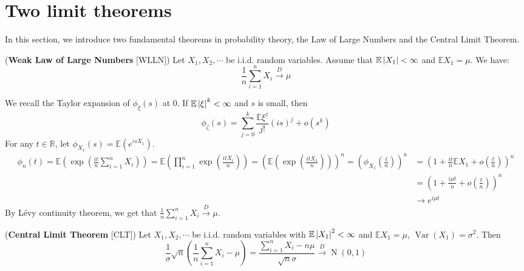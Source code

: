 \documentclass{huhtakm-template-book}
\newcommand{\expect}{\mathbb{E}}
\DeclareMathOperator{\N}{N}
\DeclareMathOperator{\Var}{Var}
\begin{document}
\section{Two limit theorems}
In this section, we introduce two fundamental theorems in probability theory, the Law of Large Numbers and the Central Limit Theorem.
\begin{thm}(\textbf{Weak Law of Large Numbers} [WLLN])
	Let $X_{1},X_{2},\cdots$ be i.i.d. random variables. Assume that $\expect\abs{X_{1}}<\infty$ and $\expect X_{1}=\mu$. We have:
	\begin{equation*}
		\frac{1}{n}\sum_{i=1}^{n}X_{i}\xrightarrow{D}\mu
	\end{equation*}
\end{thm}
\begin{proofing}
	We recall the Taylor expansion of $\phi_{\xi}(s)$ at $0$. If $\expect\abs{\xi}^{k}<\infty$ and $s$ is small, then
	\begin{equation*}
		\phi_{\zeta}(s)=\sum_{j=0}^{k}\frac{\expect\xi^{j}}{j!}(is)^{j}+o(s^{k})
	\end{equation*}
	For any $t\in\mathbb{R}$, let $\phi_{X_{1}}(s)=\expect(e^{isX_{1}})$.
	\begin{align*}
		\phi_{n}(t)=\expect\left(\exp\left(\frac{it}{n}\sum_{i=1}^{n}X_{i}\right)\right)=\expect\left(\prod_{i=1}^{n}\exp\left(\frac{itX_{i}}{n}\right)\right)=\left(\expect\left(\exp\left(\frac{itX_{1}}{n}\right)\right)\right)^{n}=\left(\phi_{X_{1}}\left(\frac{t}{n}\right)\right)^{n}&=\left(1+\frac{it}{n}\expect X_{1}+o\left(\frac{t}{n}\right)\right)^{n}\\
		&=\left(1+\frac{i\mu t}{n}+o\left(\frac{t}{n}\right)\right)^{n}\\
		&\to e^{i\mu t}
	\end{align*}
	By L\'evy continuity theorem, we get that $\frac{1}{n}\sum_{i=1}^{n}X_{i}\xrightarrow{D}\mu$.
\end{proofing}
\begin{thm}(\textbf{Central Limit Theorem} [CLT])
	Let $X_{1},X_{2},\cdots$ be i.i.d. random variables with $\expect\abs{X_{1}}^{2}<\infty$ and $\expect X_{1}=\mu$, $\Var(X_{1})=\sigma^{2}$. Then
	\begin{equation*}
		\frac{1}{\sigma}\sqrt{n}\left(\frac{1}{n}\sum_{i=1}^{n}X_{i}-\mu\right)=\frac{\sum_{i=1}^{n}X_{i}-n\mu}{\sqrt{n}\sigma}\xrightarrow{D}\N(0,1)
	\end{equation*}
\end{thm}
\end{document}
